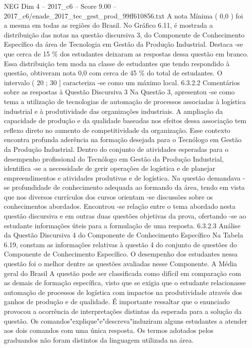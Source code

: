 \begin{textsample}{NEG Dim 4 – 2017\_c6 – Score 9.00 – 2017\_c6/enade\_2017\_tec\_gest\_prod\_99ff610856.txt}
A nota Mínima ( 0,0 ) foi a mesma em todas as regiões do Brasil.
No Gráfico 6.11, é mostrada a distribuição das notas na questão discursiva 3, do Componente de Conhecimento Específico da área de Tecnologia em Gestão da Produção Industrial.
Destaca -se que cerca de 15 \% dos estudantes deixaram as respostas dessa questão em branco.
Essa distribuição tem moda na classe de estudantes que tendo respondido à questão, obtiveram nota 0,0 com cerca de 45 \% do total de estudantes.
O intervalo ( 20 ; 30 ] caracteriza -se como um máximo local. 6.3.2.2 Comentários sobre as respostas à Questão Discursiva 3 Na Questão 3, apresentou -se como tema a utilização de tecnologias de automação de processos associadas à logística industrial e à produtividade das organizações industriais.
A ampliação da capacidade de produção e da qualidade baseadas nos efeitos dessa associação tem reflexo direto no aumento de competitividade da organização.
Esse contexto encontra profunda aderência na formação desejada para o Tecnólogo em Gestão da Produção Industrial.
Dentro do conjunto de atividades esperadas para o desempenho profissional do Tecnólogo em Gestão da Produção Industrial, identifica -se a necessidade de gerir operações de logística e de planejar empreendimentos e atividades produtivas e de logística.
Na questão demandava -se profundidade de conhecimento adequada ao formando da área, tendo em vista que nos diversos currículos dos cursos orientam -se discussões sobre os conhecimentos abordados.
Encontrou -se relação entre o tema abordado nesta questão discursiva e em outras duas questões objetivas da prova, ofertando -se ao estudante informações úteis para a formulação de uma resposta. 6.3.2.3 Análise da Questão Discursiva 4 do Componente de Conhecimento Específico Na Tabela 6.19, constam as informações relativas à questão 4 do conjunto de questões do Componente de Conhecimento Específico.
O desempenho dos estudantes nessa questão foi o melhor dentre as questões avaliadas nesse Componente.
A Média geral do Brasil A questão pode ser classificada como difícil em comparação com as demais de formação específica, visto que se exigia que o estudante relacionasse automação de processos de logística com impactos na produtividade através dos ganhos de produção e de qualidade.
É importante ressaltar que o enunciado provocou a ocorrência de interpretações distintas da esperada para a solução da questão.
Os comandos"explique"e"descreva"induziram alguns estudantes a atender aos dois comandos com uma única resposta.
Os termos adotados pelos graduandos não foram distintos da linguagem utilizada na área.

\end{textsample}
